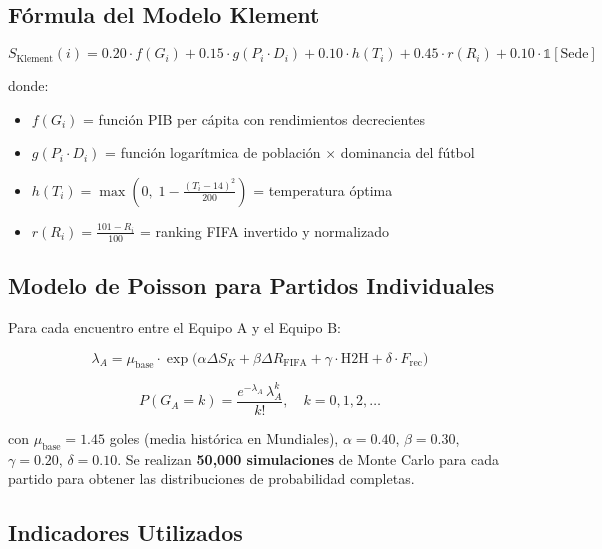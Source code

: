 \documentclass[11pt,a4paper]{article}
\begin{document}
\subsection{Fórmula del Modelo Klement}

\begin{equation}
S_{\text{Klement}}(i) = 0.20 \cdot f(G_i) + 0.15 \cdot g(P_i \cdot D_i) + 0.10 \cdot h(T_i) + 0.45 \cdot r(R_i) + 0.10 \cdot \mathbb{1}[\text{Sede}]
\end{equation}

donde:
\begin{itemize}[itemsep=2pt]
\item $f(G_i)$ = función PIB per cápita con rendimientos decrecientes
\item $g(P_i \cdot D_i)$ = función logarítmica de población $\times$ dominancia del fútbol
\item $h(T_i) = \max\!\left(0,\; 1 - \frac{(T_i - 14)^2}{200}\right)$ = temperatura óptima
\item $r(R_i) = \frac{101 - R_i}{100}$ = ranking FIFA invertido y normalizado
\end{itemize}

\subsection{Modelo de Poisson para Partidos Individuales}

Para cada encuentro entre el Equipo A y el Equipo B:

\begin{equation}
\lambda_A = \mu_{\text{base}} \cdot \exp\!\Big(\alpha \Delta S_K + \beta \Delta R_{\text{FIFA}} + \gamma \cdot \text{H2H} + \delta \cdot F_{\text{rec}}\Big)
\end{equation}

\begin{equation}
P(G_A = k) = \frac{e^{-\lambda_A}\,\lambda_A^k}{k!}, \quad k = 0,1,2,\ldots
\end{equation}

con $\mu_{\text{base}} = 1.45$ goles (media histórica en Mundiales), $\alpha=0.40$, $\beta=0.30$, 
$\gamma=0.20$, $\delta=0.10$. Se realizan \textbf{50,000 simulaciones} de Monte Carlo para cada 
partido para obtener las distribuciones de probabilidad completas.

\subsection{Indicadores Utilizados}
\end{document}
